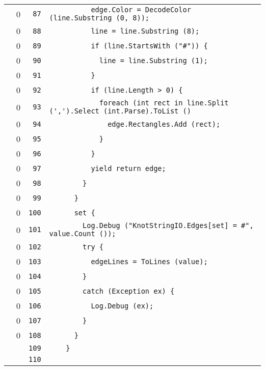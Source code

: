 \documentclass[a4paper,10pt]{article}
\begin{document}
\begin{longtable}[l]{lrrl}
\cellcolor{red} & 0 & \verb~87~ & \verb~          edge.Color = DecodeColor (line.Substring (0, 8));~\\
\cellcolor{red} & 0 & \verb~88~ & \verb~          line = line.Substring (8);~\\
\cellcolor{red} & 0 & \verb~89~ & \verb~          if (line.StartsWith ("#")) {~\\
\cellcolor{red} & 0 & \verb~90~ & \verb~            line = line.Substring (1);~\\
\cellcolor{red} & 0 & \verb~91~ & \verb~          }~\\
\cellcolor{red} & 0 & \verb~92~ & \verb~          if (line.Length > 0) {~\\
\cellcolor{red} & 0 & \verb~93~ & \verb~            foreach (int rect in line.Split (',').Select (int.Parse).ToList ()~\\
\cellcolor{red} & 0 & \verb~94~ & \verb~              edge.Rectangles.Add (rect);~\\
\cellcolor{red} & 0 & \verb~95~ & \verb~            }~\\
\cellcolor{red} & 0 & \verb~96~ & \verb~          }~\\
\cellcolor{red} & 0 & \verb~97~ & \verb~          yield return edge;~\\
\cellcolor{red} & 0 & \verb~98~ & \verb~        }~\\
\cellcolor{red} & 0 & \verb~99~ & \verb~      }~\\
\cellcolor{red} & 0 & \verb~100~ & \verb~      set {~\\
\cellcolor{red} & 0 & \verb~101~ & \verb~        Log.Debug ("KnotStringIO.Edges[set] = #", value.Count ());~\\
\cellcolor{red} & 0 & \verb~102~ & \verb~        try {~\\
\cellcolor{red} & 0 & \verb~103~ & \verb~          edgeLines = ToLines (value);~\\
\cellcolor{red} & 0 & \verb~104~ & \verb~        }~\\
\cellcolor{red} & 0 & \verb~105~ & \verb~        catch (Exception ex) {~\\
\cellcolor{red} & 0 & \verb~106~ & \verb~          Log.Debug (ex);~\\
\cellcolor{red} & 0 & \verb~107~ & \verb~        }~\\
\cellcolor{red} & 0 & \verb~108~ & \verb~      }~\\
\cellcolor{gray} &  & \verb~109~ & \verb~    }~\\
\cellcolor{gray} &  & \verb~110~ & \verb~~\\

\end{longtable}
\end{document}
